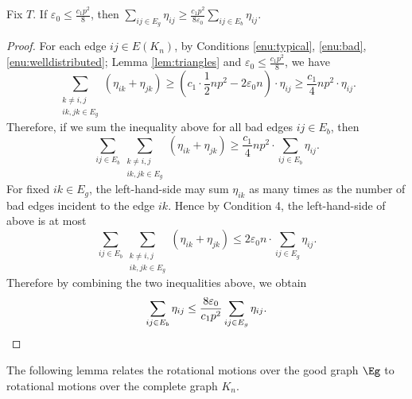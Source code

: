 \begin{lemma} \label{lem:badgood} 
Fix $T$. If $\varepsilon_0 \leq \frac{c_1 p^2}{8}$, then $\sum_{ij\in E_{g}}\eta_{ij}\ge\frac{c_{1}p^{2}}{8\varepsilon_0}\sum_{ij\in E_{b}}\eta_{ij}$. 
\end{lemma}
\begin{proof}
For each edge $ij \in E(K_n)$, by Conditions \ref{enu:typical}, \ref{enu:bad}, \ref{enu:welldistributed}; Lemma \ref{lem:triangles} and $\varepsilon_0 \leq \frac{c_1p^2}{8}$,
we have 
\[
	\sum_{\substack{k\neq i,j\\ik,jk\in E_{g}}}(\eta_{ik}+\eta_{jk})
	\ge\left(c_{1}\cdot\frac{1}{2}np^{2}-2\varepsilon_0n\right)\cdot\eta_{ij}
	\ge\frac{c_{1}}{4}np^{2}\cdot\eta_{ij}.
\]
Therefore, if we sum the inequality above for all bad edges $ij\in E_{b}$, then
\[
	\sum_{ij\in E_{b}}\sum_{\substack{k\neq i,j\\ik,jk\in E_{g}}} (\eta_{ik}+\eta_{jk})
	\ge\frac{c_{1}}{4}np^{2}\cdot\sum_{ij\in E_{b}}\eta_{ij}.
\]
For fixed $ik\in E_{g}$, the left-hand-side may sum $\eta_{ik}$
as many times as the number of bad edges incident to the edge $ik$.
Hence by Condition 4, the left-hand-side of above is at most 
\[
	\sum_{ij\in E_{b}} \sum_{\substack{k\neq i,j\\ik,jk\in E_{g}}} (\eta_{ik}+\eta_{jk})
	\le 2\varepsilon_0 n\cdot\sum_{ij\in E_{g}}\eta_{ij}.
\]
Therefore by combining the two inequalities above, we obtain 
\[
	\sum_{ij\in E_{b}}\eta_{ij}
	\le\frac{8\varepsilon_0}{c_{1}p^{2}}\sum_{ij\in E_{g}}\eta_{ij}. %
	\qedhere
\]
\end{proof}

The following lemma relates the rotational motions over the good graph $\Eg$ to rotational motions over the complete graph $K_n$.

